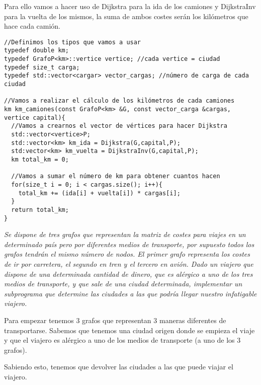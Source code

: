 Para ello vamos a hacer uso de Dijkstra para la ida de los camiones y DijkstraInv para la vuelta de los mismos, la suma de ambos costes serán los kilómetros que hace cada camión.

\begin{verbatim}
//Definimos los tipos que vamos a usar
typedef double km;
typedef GrafoP<km>::vertice vertice; //cada vertice = ciudad
typedef size_t carga;
typedef std::vector<cargar> vector_cargas; //número de carga de cada ciudad

//Vamos a realizar el cálculo de los kilómetros de cada camiones
km km_camiones(const GrafoP<km> &G, const vector_carga &cargas, vertice capital){
  //Vamos a crearnos el vector de vértices para hacer Dijkstra
  std::vector<vertice>P;
  std::vector<km> km_ida = Dijkstra(G,capital,P);
  std:vector<km> km_vuelta = DijkstraInv(G,capital,P);
  km total_km = 0;

  //Vamos a sumar el número de km para obtener cuantos hacen
  for(size_t i = 0; i < cargas.size(); i++){
    total_km += (ida[i] + vuelta[i]) * cargas[i];
  }
  return total_km;
}
\end{verbatim}

\textbf{\large{}}\textit{ Se dispone de tres grafos que representan la matriz de costes para viajes en un determinado país pero por diferentes medios de transporte, por supuesto todos los grafos tendrán el mismo número de nodos. El primer grafo representa los costes de ir por carretera, el segundo en tren y el tercero en avión. Dado un viajero que dispone de una determinada cantidad de dinero, que es alérgico a uno de los tres medios de transporte, y que sale de una ciudad determinada, implementar un subprograma que determine las ciudades a las que podría llegar nuestro infatigable viajero.}

Para empezar tenemos 3 grafos que representan 3 maneras diferentes de transportarse. Sabemos que tenemos una ciudad origen donde se empieza el viaje y que el viajero es alérgico a uno de los medios de transporte (a uno de los 3 grafos).

Sabiendo esto, tenemos que devolver las ciudades a las que puede viajar el viajero.


